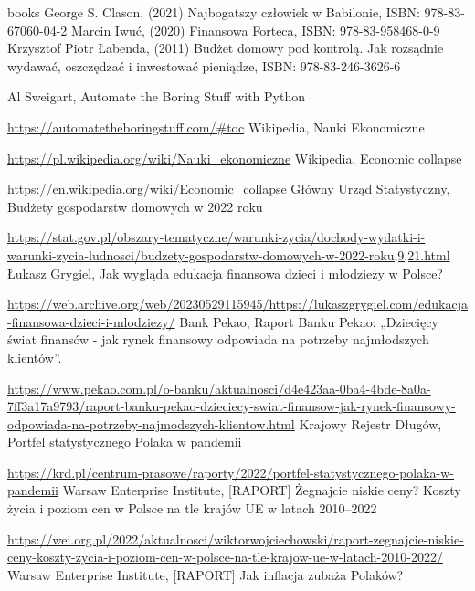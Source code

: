 \documentclass[a4paper,10pt, twoside]{report}
\begin{document}
\begin{large}


\begin{thebibliography} {books}
     George S. Clason, (2021) Najbogatszy człowiek w Babilonie, ISBN: 978-83-67060-04-2
     Marcin Iwuć, (2020) Finansowa Forteca, ISBN: 978-83-958468-0-9
     Krzysztof Piotr Łabenda, (2011) Budżet domowy pod kontrolą. Jak rozsądnie wydawać, oszczędzać i inwestować pieniądze, ISBN: 978-83-246-3626-6

     Al Sweigart, Automate the Boring Stuff with Python \raggedright\url{
        https://automatetheboringstuff.com/#toc}
     Wikipedia, Nauki Ekonomiczne \raggedright\url{
        https://pl.wikipedia.org/wiki/Nauki_ekonomiczne}
     Wikipedia, Economic collapse \raggedright\url{
        https://en.wikipedia.org/wiki/Economic_collapse}
     Główny Urząd Statystyczny, Budżety gospodarstw domowych w 2022 roku \raggedright\url{
        https://stat.gov.pl/obszary-tematyczne/warunki-zycia/dochody-wydatki-i-warunki-zycia-ludnosci/budzety-gospodarstw-domowych-w-2022-roku,9,21.html}
     Łukasz Grygiel, Jak wygląda edukacja finansowa dzieci i młodzieży w Polsce? \raggedright\url{
        https://web.archive.org/web/20230529115945/https://lukaszgrygiel.com/edukacja-finansowa-dzieci-i-mlodziezy/}
     Bank Pekao, Raport Banku Pekao: „Dziecięcy świat finansów - jak rynek finansowy odpowiada na potrzeby najmłodszych klientów”. \raggedright\url{
        https://www.pekao.com.pl/o-banku/aktualnosci/d4e423aa-0ba4-4bde-8a0a-7ff3a17a9793/raport-banku-pekao-dzieciecy-swiat-finansow-jak-rynek-finansowy-odpowiada-na-potrzeby-najmodszych-klientow.html}
     Krajowy Rejestr Długów, Portfel statystycznego Polaka w pandemii \raggedright\url{
        https://krd.pl/centrum-prasowe/raporty/2022/portfel-statystycznego-polaka-w-pandemii}
     Warsaw Enterprise Institute, [RAPORT] Żegnajcie niskie ceny? Koszty życia i poziom cen w Polsce na tle krajów UE w latach 2010–2022 \raggedright\url{
        https://wei.org.pl/2022/aktualnosci/wiktorwojciechowski/raport-zegnajcie-niskie-ceny-koszty-zycia-i-poziom-cen-w-polsce-na-tle-krajow-ue-w-latach-2010-2022/}
     Warsaw Enterprise Institute, [RAPORT] Jak inflacja zubaża Polaków? \raggedright\url{
}
\end{thebibliography}
\end{large}
\end{document}
